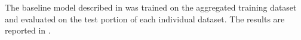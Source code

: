 
The baseline model described in 
was trained on the aggregated training dataset and evaluated
on the test portion of each individual dataset. The results
are reported in .

